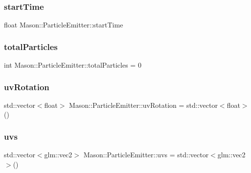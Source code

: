 \subsubsection{\texorpdfstring{start\+Time}{startTime}}
{\footnotesize\ttfamily float Mason\+::\+Particle\+Emitter\+::start\+Time\hspace{0.3cm}{\ttfamily [protected]}}

\hypertarget{class_mason_1_1_particle_emitter_afc99ceabe0f61e289bc7e6d4c3b1b038}{}\label{class_mason_1_1_particle_emitter_afc99ceabe0f61e289bc7e6d4c3b1b038} 
\subsubsection{\texorpdfstring{total\+Particles}{totalParticles}}
{\footnotesize\ttfamily int Mason\+::\+Particle\+Emitter\+::total\+Particles = 0\hspace{0.3cm}{\ttfamily [protected]}}

\hypertarget{class_mason_1_1_particle_emitter_a477934ce692453792d8be3ff51a3d22f}{}\label{class_mason_1_1_particle_emitter_a477934ce692453792d8be3ff51a3d22f} 
\subsubsection{\texorpdfstring{uv\+Rotation}{uvRotation}}
{\footnotesize\ttfamily std\+::vector$<$float$>$ Mason\+::\+Particle\+Emitter\+::uv\+Rotation = std\+::vector$<$float$>$()\hspace{0.3cm}{\ttfamily [protected]}}

\hypertarget{class_mason_1_1_particle_emitter_a6979395fb93878859edace9ab327dcc4}{}\label{class_mason_1_1_particle_emitter_a6979395fb93878859edace9ab327dcc4} 
\subsubsection{\texorpdfstring{uvs}{uvs}}
{\footnotesize\ttfamily std\+::vector$<$glm\+::vec2$>$ Mason\+::\+Particle\+Emitter\+::uvs = std\+::vector$<$glm\+::vec2$>$()\hspace{0.3cm}{\ttfamily [protected]}}

